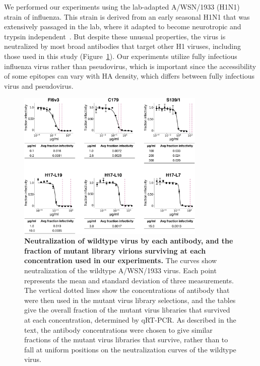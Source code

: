 \documentclass[11pt]{article}
\begin{document}
We performed our experiments using the lab-adapted A/WSN/1933 (H1N1) strain of influenza.
This strain is derived from an early seasonal H1N1 that was extensively passaged in the lab, where it adapted to become neurotropic and trypsin independent~\cite{sun2010modifications}.
But despite these unusual properties, the virus is neutralized by most broad antibodies that target other H1 viruses, including those used in this study (Figure~\ref{fig:neutcurves}).
Our experiments utilize fully infectious influenza virus rather than pseudovirus, which is important since the accessibility of some epitopes can vary with HA density, which differs between fully infectious virus and pseudovirus\cite{corti2011neutralizing,joyce2016vaccine}.

\begin{figure}
\centerline{\includegraphics[width=0.8\textwidth]{figs/neutralization_curves/WT_neutralization_curves.pdf}}
\caption{\label{fig:neutcurves}
{\bf Neutralization of wildtype virus by each antibody, and the fraction of mutant library virions surviving at each concentration used in our experiments.}
The curves show neutralization of the wildtype A/WSN/1933 virus. 
Each point represents the mean and standard deviation of three measurements. 
The vertical dotted lines show the concentrations of antibody that were then used in the mutant virus library selections, and the tables give the overall fraction of the mutant virus libraries that survived at each concentration, determined by qRT-PCR.
As described in the text, the antibody concentrations were chosen to give similar fractions of the mutant virus libraries that survive, rather than to fall at uniform positions on the neutralization curves of the wildtype virus.
}
\end{figure}
\end{document}
